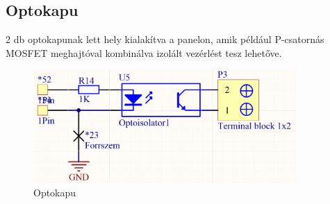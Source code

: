 \subsection{Optokapu}
2 db optokapunak lett hely kialakítva a panelon, amik például P-csatornás MOSFET meghajtóval kombinálva izolált vezérlést tesz lehetőve.

\begin{figure}[!ht]
    \centering
    \includegraphics[width=100mm, keepaspectratio]{figures/opto.png}
    \caption{Optokapu}
    \label{fig:opto_gate}
\end{figure}
\clearpage

